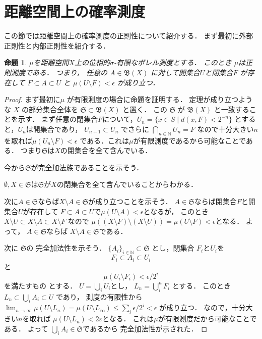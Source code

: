 \documentclass[leqno, a4paper, 12pt]{jsarticle}
\newtheorem{prop}[thm]{命題}
\newcommand{\nn}{\mathbb{N}}
\newcommand{\ep}{\varepsilon}
\begin{document}
\section{距離空間上の確率測度}
この節では距離空間上の確率測度の正則性について紹介する．
まず最初に外部正則性と内部正則性を紹介する．
\begin{prop}\label{prop:regular}
$\mu$を距離空間$X$上の位相的$\sigma$-有限なボレル測度とする．
このとき
$\mu$は正則測度である．
つまり，
任意の
$A\in \mathfrak{B}(X)$
に対して開集合$U$と閉集合$F$
が存在して
$F\subset A\subset U$
と
$\mu(U\setminus F)<\epsilon$
が成り立つ．
\end{prop}
\begin{proof}
まず最初に$\mu$
が有限測度の場合に命題を証明する．
定理が成り立つような
$X$
の部分集合全体を
$\mathfrak{S}\subset \mathfrak{B}(X)$
と置く．
この
$\mathfrak{S}$
が
$\mathfrak{B}(X)$
と一致することを示す．
まず任意の閉集合$F$について，$U_n=\{x\in S\mid d(x, F)<2^{-n}\}$
とすると，$U_n$は開集合であり， 
$U_{n+1}\subset U_n$
でさらに
$\bigcap_{n\in \nn}U_n=F$
なので十分大きい$n$を取れば$\mu(U_n\setminus F)<\epsilon$
である．これは$\mu$が有限測度であるから可能なことである．
つまり$\mathfrak{S}$は$X$の閉集合を全て含んでいる．

今から$\mathfrak{S}$が完全加法族であることを示そう．

$\emptyset, X\in \mathfrak{S}$は$\mathfrak{S}$が$X$の閉集合を全て含んでいることからわかる．

次に$A\in \mathfrak{S}$ならば$X\setminus A\in \mathfrak{S}$が成り立つことを示そう．
$A\in \mathfrak{S}$ならば閉集合$F$と開集合$U$が存在して
$F\subset A\subset U$で$\mu(U\setminus A)<\epsilon$となるが，
このとき$X\setminus U\subset X\setminus A\subset X\setminus F$
なので
$\mu((X\setminus F)\setminus (X\setminus U))=\mu(U\setminus F)<\epsilon$となる．
よって，
$A\in \mathfrak{S}$ならば
$X\setminus A\in \mathfrak{S}$である．

次に
$\mathfrak{S}$の
完全加法性を示そう．
$\{A_i\}_{i\in \nn}\subset \mathfrak{S}$
とし，閉集合
$F_i$と$U_i$を
\[
F_i\subset A_i\subset U_i
\]
と
\[
\mu(U_i\setminus F_i)<\epsilon/2^i
\]
を満たすもの
とする．
$U=\bigcup_iU_i$とし，
$L_n=\bigcup_{i}^nF_i$
とする．
このとき
$L_n\subset \bigcup_iA_i\subset U$
であり，
測度の有限性から
$\lim_{n\to \infty}\mu(U\setminus L_n)=\mu(U\setminus L_{\infty})
\le \sum_i\epsilon/2^i<\epsilon$
が成り立つ．
なので，十分大きい$n$を取れば
$\mu(U\setminus L_n)<2\ep$となる．
これは$\mu$が有限測度だから可能なことである．
よって
$\bigcup_{i}A_i\in \mathfrak{S}$であるから
完全加法性が示された．



\end{proof}
\end{document}
